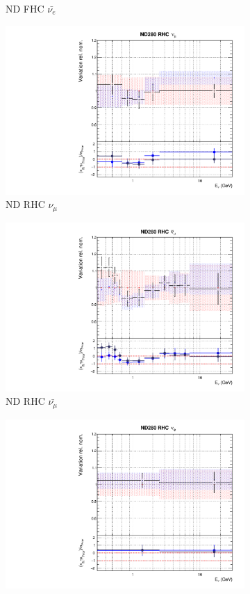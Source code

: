 \begin{figure}[t]
\begin{subfigure}{0.45\textwidth}
  \caption{ND FHC $\bar{\nu_{e}}$}
\end{subfigure}
\begin{subfigure}{0.45\textwidth}
  \centering
  \includegraphics[width=0.75\linewidth]{figs/rhcmpdat28flux_4}
  \caption{ND RHC $\nu_{\mu}$}
\end{subfigure}
\begin{subfigure}{0.45\textwidth}
  \centering
  \includegraphics[width=0.75\linewidth]{figs/rhcmpdat28flux_5}
  \caption{ND RHC $\bar{\nu_{\mu}}$}
\end{subfigure}
\begin{subfigure}{0.45\textwidth}
  \centering
  \includegraphics[width=0.75\linewidth]{figs/rhcmpdat28flux_6}

\end{subfigure}
\end{figure}
